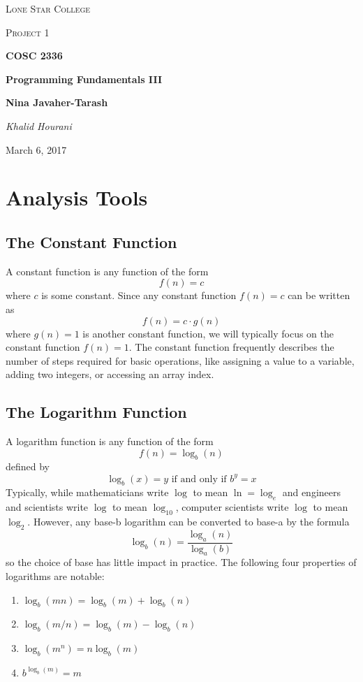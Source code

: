 \documentclass[a4paper]{article}
\begin{document}
\begin{titlepage}
	\centering
	{\scshape\LARGE Lone Star College \par}
	\vspace{1cm}
	{\scshape\Large Project 1\par}
	\vspace{1.5cm}
	{\huge\bfseries COSC 2336 \par}
	{\huge\bfseries Programming Fundamentals III\par}
	\vspace{0.5cm}
	{\large\bfseries Nina Javaher-Tarash\par}
	\vspace{2cm}
	{\Large\itshape Khalid Hourani\par}
	\vspace{0.5cm}
	{\large March 6, 2017\par}
	\vfill

\end{titlepage}
\section{Analysis Tools}
\subsection{The Constant Function}
A constant function is any function of the form \[f(n) = c\] where $c$ is some constant. Since any constant function $f(n) = c$ can be written as \[f(n) = c \cdot g(n)\] where $g(n) = 1$ is another constant function, we will typically focus on the constant function $f(n)=1$. The constant function frequently describes the number of steps required for basic operations, like assigning a value to a variable, adding two integers, or accessing an array index. 

\subsection{The Logarithm Function}

  A logarithm function is any function of the form \[f(n)=\log_b(n)\] defined by \[\log_b(x)=y\text{ if and only if } b^y=x\] Typically, while mathematicians write $\log$ to mean $\ln=\log_e$ and engineers and scientists write $\log$ to mean $\log_{10}$, computer scientists write $\log$ to mean $\log_2$. However, any base-b logarithm can be converted to base-a by the formula \[\log_b(n)=\frac{\log_a(n)}{\log_a(b)}\] so the choice of base has little impact in practice. The following four properties of logarithms are notable:
  \begin{enumerate}
  \item $\log_b(mn) = \log_b(m)+\log_b(n)$
  \item $\log_b(m/n) = \log_b(m) - \log_b(n)$
  \item $\log_b(m^n) = n\log_b(m)$
  \item $b^{\log_b(m)} = m$
  \end{enumerate}
\end{document}
